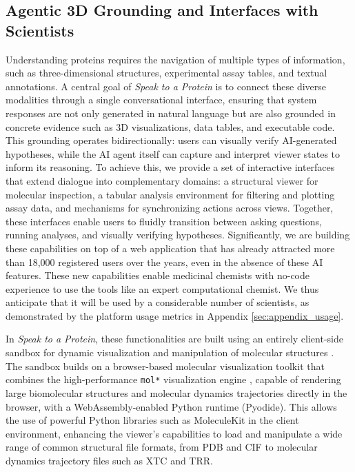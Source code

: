 \documentclass{article}
\begin{document}
\subsection{Agentic 3D Grounding and Interfaces with Scientists}\label{subsec:viewer}

Understanding proteins requires the navigation of multiple types of information, such as three-dimensional structures, experimental assay tables, and textual annotations. A central goal of \emph{Speak to a Protein} is to connect these diverse modalities through a single conversational interface, ensuring that system responses are not only generated in natural language but are also grounded in concrete evidence such as 3D visualizations, data tables, and executable code. This grounding operates bidirectionally: users can visually verify AI-generated hypotheses, while the AI agent itself can capture and interpret viewer states to inform its reasoning. To achieve this, we provide a set of interactive interfaces that extend dialogue into complementary domains: a structural viewer for molecular inspection, a tabular analysis environment for filtering and plotting assay data, and mechanisms for synchronizing actions across views. Together, these interfaces enable users to fluidly transition between asking questions, running analyses, and visually verifying hypotheses. Significantly, we are building these capabilities on top of a web application that has already attracted more than 18,000 registered users over the years, even in the absence of these AI features. These new capabilities enable medicinal chemists with no-code experience to use the tools like an expert computational chemist. We thus anticipate that it will be used by a considerable number of scientists, as demonstrated by the platform usage metrics in Appendix \ref{sec:appendix_usage}.


In \emph{Speak to a Protein}, these functionalities are built using an entirely client-side sandbox for dynamic visualization and manipulation of molecular structures \citep{torrens2023playmolecule}. The sandbox builds on a browser-based molecular visualization toolkit that combines the high-performance \texttt{mol*} visualization engine \citep{Sehnal2021},  capable of rendering large biomolecular structures and molecular dynamics trajectories directly in the browser, with a WebAssembly-enabled Python runtime (Pyodide). This allows the use of powerful Python libraries such as MoleculeKit \citep{Doerr2016} in the client environment, enhancing the viewer's capabilities to load and manipulate a wide range of common structural file formats, from PDB and CIF to molecular dynamics trajectory files such as XTC and TRR.
\end{document}
